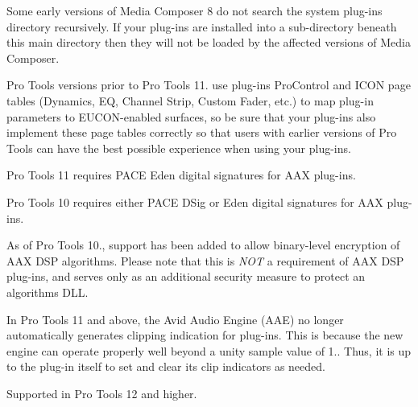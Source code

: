 \begin{DoxyRefList}
\item[Module \mbox{\hyperlink{a00831}{A\+A\+X\+\_\+\+Media\+\_\+\+Composer\+\_\+\+Guide}} ]\label{a00786__compatibility_notes000008}%
%
 Some early versions of Media Composer 8 do not search the system plug-\/ins directory recursively. If your plug-\/ins are installed into a sub-\/directory beneath this main directory then they will not be loaded by the affected versions of Media Composer. 
\item[Module \mbox{\hyperlink{a00833}{A\+A\+X\+\_\+\+Page\+\_\+\+Table\+\_\+\+Guide}} ]\label{a00786__compatibility_notes000021}%
%
 Pro Tools versions prior to Pro Tools 11. use plug-\/ins\textquotesingle{} Pro\+Control and I\+C\+ON page tables (Dynamics, EQ, Channel Strip, Custom Fader, etc.) to map plug-\/in parameters to E\+U\+C\+O\+N-\/enabled surfaces, so be sure that your plug-\/ins also implement these page tables correctly so that users with earlier versions of Pro Tools can have the best possible experience when using your plug-\/ins. 
\item[Module \mbox{\hyperlink{a00830}{A\+A\+X\+\_\+\+Pro\+\_\+\+Tools\+\_\+\+Guide}} ]\label{a00786__compatibility_notes000012}%
%
 Pro Tools 11 requires P\+A\+CE Eden digital signatures for A\+AX plug-\/ins.

\label{a00786__compatibility_notes000013}%
%
 Pro Tools 10 requires either P\+A\+CE D\+Sig or Eden digital signatures for A\+AX plug-\/ins.

\label{a00786__compatibility_notes000014}%
%
 As of Pro Tools 10., support has been added to allow binary-\/level encryption of A\+AX D\+SP algorithms. Please note that this is {\itshape N\+OT} a requirement of A\+AX D\+SP plug-\/ins, and serves only as an additional security measure to protect an algorithm\textquotesingle{}s D\+LL. 

\label{a00786__compatibility_notes000015}%
%
 In Pro Tools 11 and above, the Avid Audio Engine (A\+AE) no longer automatically generates clipping indication for plug-\/ins. This is because the new engine can operate properly well beyond a unity sample value of 1.. Thus, it is up to the plug-\/in itself to set and clear its clip indicators as needed.

\label{a00786__compatibility_notes000016}%
%
 Supported in Pro Tools 12 and higher.


\end{DoxyRefList}
